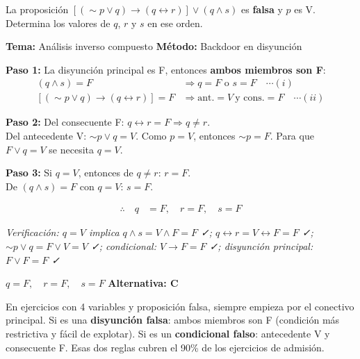 \vspace{0.5cm}

\begin{tcolorbox}[
  enhanced, breakable,
  colback=GrisClaro, colframe=AzulPizarra,
  fonttitle=\bfseries\sffamily,
  title={Ejercicio 15 — Nivel UNI: hallar $q$, $r$ y $s$},
  arc=3pt, boxrule=0.8pt
]

\begin{problema}
La proposición $[(\sim p \vee q) \rightarrow (q \leftrightarrow r)] \vee (q \wedge s)$ es \textbf{falsa} y $p$ es V. Determina los valores de $q$, $r$ y $s$ en ese orden.
\end{problema}

\smallskip
\noindent
\textbf{\sffamily\color{AzulMedio}Tema:} Análisis inverso compuesto \hfill
\textbf{\sffamily\color{AzulMedio}Método:} Backdoor en disyunción

\medskip
\noindent\textbf{Paso 1:} La disyunción principal es F, entonces \textbf{ambos miembros son F}:
\begin{align*}
  (q \wedge s) = F &\Rightarrow q = F \text{ o } s = F \quad \cdots (i)\\
  [(\sim p \vee q) \rightarrow (q \leftrightarrow r)] = F &\Rightarrow \text{ant.}=V\ \text{y cons.}=F \quad \cdots (ii)
\end{align*}

\noindent\textbf{Paso 2:} Del consecuente F: $q \leftrightarrow r = F \Rightarrow q \neq r$.\\
Del antecedente V: $\sim p \vee q = V$. Como $p = V$, entonces $\sim p = F$. Para que $F \vee q = V$ se necesita $q = V$.

\noindent\textbf{Paso 3:} Si $q = V$, entonces de $q \neq r$: $r = F$.\\
De $(q \wedge s) = F$ con $q = V$: $s = F$.

\begin{align*}
  \therefore \quad q &= F,\quad r = F,\quad s = F
\end{align*}

\noindent\textit{Verificación: $q = V$ implica $q \wedge s = V \wedge F = F$ ✓; $q \leftrightarrow r = V \leftrightarrow F = F$ ✓; $\sim p \vee q = F \vee V = V$ ✓; condicional: $V \rightarrow F = F$ ✓; disyunción principal: $F \vee F = F$ ✓}

\begin{tcolorbox}[colback=AzulClaro!60, colframe=AzulPizarra, arc=2pt, boxrule=0.8pt, left=8pt, right=8pt]
\centering
$\displaystyle \boxed{q = F,\quad r = F,\quad s = F}$ \quad \textbf{Alternativa: C}
\end{tcolorbox}

\begin{cajatip}
En ejercicios con 4 variables y proposición falsa, siempre empieza por el conectivo principal. Si es una \textbf{disyunción falsa}: ambos miembros son F (condición más restrictiva y fácil de explotar). Si es un \textbf{condicional falso}: antecedente V y consecuente F. Esas dos reglas cubren el 90\% de los ejercicios de admisión.
\end{cajatip}
\end{tcolorbox}

